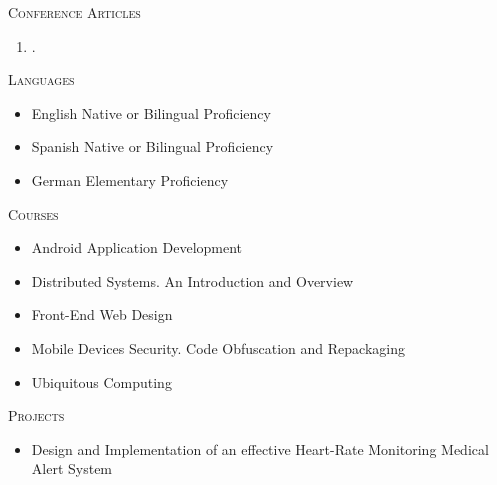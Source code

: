 \documentclass[11pt]{article}
\let\oldbibentry\bibentry
\renewcommand{\bibentry}[1]{\oldbibentry{#1}.}
\renewcommand{\section}[1]
{\vspace{1.0\baselineskip}{\Large\textbf{#1}}}
\begin{document}
\textsc{Conference Articles}
\begin{enumerate}[resume]
  \item {}
\end{enumerate}



\section{Skills}

\textsc{Languages}
\begin{itemize}
    \item[] English \hfill Native or Bilingual Proficiency
    \item[] Spanish \hfill Native or Bilingual Proficiency
    \item[] German \hfill Elementary Proficiency
\end{itemize}

\textsc{Courses}
\begin{itemize}
    \item[] Android Application Development
    \item[] Distributed Systems. An Introduction and Overview
    \item[] Front-End Web Design
    \item[] Mobile Devices Security. Code Obfuscation and Repackaging
    \item[] Ubiquitous Computing
\end{itemize}



\textsc{Projects}
\begin{itemize}
    \item[] Design and Implementation of an effective Heart-Rate Monitoring Medical Alert System
\end{itemize}


\end{document}
